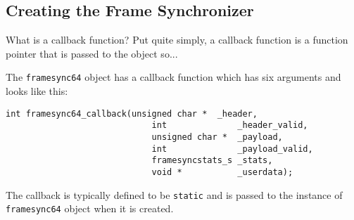 %
%
\subsection{Creating the Frame Synchronizer}
\label{tutorial:framing:framesync}

What is a callback function?
Put quite simply, a callback function is a function pointer that is
passed to the object so...

The {\tt framesync64} object has a callback function which has six
arguments and looks like this:
%
\begin{Verbatim}[fontsize=\small]
    int framesync64_callback(unsigned char *  _header,
                             int              _header_valid,
                             unsigned char *  _payload,
                             int              _payload_valid,
                             framesyncstats_s _stats,
                             void *           _userdata);
\end{Verbatim}
%
The callback is typically defined to be {\tt static} and is passed to
the instance of {\tt framesync64} object when it is created.
%
